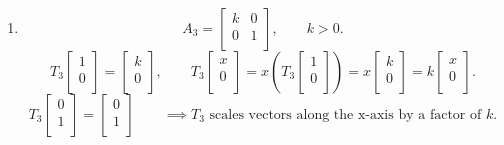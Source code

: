 \documentclass{report}
\begin{document}
{\begin{enumerate}[label=(\roman*)]
\begin{tikzpicture}[line cap=round,line join=round,>=Stealth,
                    every node/.style={inner sep=0pt, font=\small}]
\end{tikzpicture}
\\
 \\
			      $ T_2$ fixes the x axis and projects the y-axis orthogonally onto the origin\\
			      $ T_2$ orthogonally projects $ \mathbb{R} ^2$ onto the $ x$-axis.\\
                \item 
			\[
			A_3 = \begin{bmatrix}
			k & 0\\
			0 & 1\\
			\end{bmatrix}  , \qquad k >0
			.\] 
			\[
			T_3 \begin{bmatrix}
			1\\
			0\\
			\end{bmatrix}
			= \begin{bmatrix}
			k\\
			0\\
			\end{bmatrix}
			, \qquad T_3 \begin{bmatrix}
			x\\
			0\\
			\end{bmatrix}       = x \left(  T_3 \begin{bmatrix}
			1\\
			0\\
			\end{bmatrix}
			 \right) 
			    = x \begin{bmatrix}
			    k\\
			    0\\
			    \end{bmatrix}
			    = k \begin{bmatrix}
			    x\\
			    0\\
			    \end{bmatrix}
			.\] 
			\[
			T_3 \begin{bmatrix}
			0\\
			1\\
			\end{bmatrix}
			= \begin{bmatrix}
			0\\
			1\\
			\end{bmatrix}
			\qquad \implies            T_3 \text{ scales vectors along the x-axis by a factor of } k 
			.\] 

\end{enumerate}}
\end{document}
